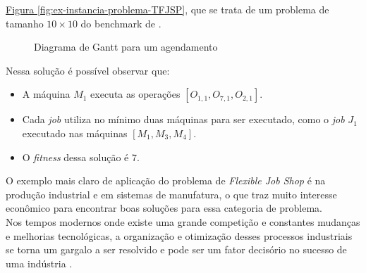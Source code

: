 \hyperref[fig:ex-instancia-problema-TFJSP]{Figura \ref{fig:ex-instancia-problema-TFJSP}}, 
que se trata de um problema de tamanho $10\times10$ do benchmark de  \cite{Kacem2002}.\\
\begin{figure}[ht]
    \centering
    \caption{Diagrama de Gantt para um agendamento}
    \label{fig:plot-gantt}
    \resizebox{\textwidth}{!}{}
\end{figure}
\noindent Nessa solução é possível observar que:
\begin{itemize}
    \item A máquina $M_1$ executa as operações $[O_{1,1}, O_{7,1}, O_{2,1}]$.
    \item Cada \textit{job} utiliza no mínimo duas máquinas para ser executado, como o \textit{job} $J_1$ executado nas máquinas $[M_1 , M_3, M_4]$.
    \item O \textit{fitness} dessa solução é $7$.
\end{itemize}
\indent O exemplo mais claro de aplicação do problema de \textit{Flexible Job Shop} é na produção industrial e em sistemas de manufatura, o que traz muito interesse econômico para encontrar boas soluções para essa categoria de problema.\\
%
\indent Nos tempos modernos onde existe uma grande competição e constantes mudanças e melhorias tecnológicas, a organização e otimização desses processos industriais se torna um gargalo a ser resolvido e pode ser um fator decisório no sucesso de uma indústria \cite{Wari2016}.
